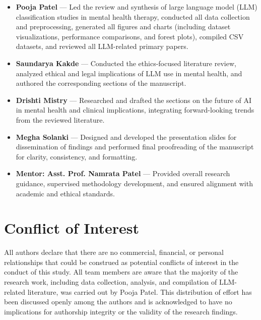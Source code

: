\documentclass[journal]{IEEEtran}
\begin{document}
\begin{itemize}
    \item \textbf{Pooja Patel} --- Led the review and synthesis of large language model (LLM) classification studies in mental health therapy, conducted all data collection and preprocessing, generated all figures and charts (including dataset visualizations, performance comparisons, and forest plots), compiled CSV datasets, and reviewed all LLM-related primary papers.
    
    \item \textbf{Saundarya Kakde} --- Conducted the ethics-focused literature review, analyzed ethical and legal implications of LLM use in mental health, and authored the corresponding sections of the manuscript.
    
    \item \textbf{Drishti Mistry} --- Researched and drafted the sections on the future of AI in mental health and clinical implications, integrating forward-looking trends from the reviewed literature.
    
    \item \textbf{Megha Solanki} --- Designed and developed the presentation slides for dissemination of findings and performed final proofreading of the manuscript for clarity, consistency, and formatting.
    
    \item \textbf{Mentor: Asst. Prof. Namrata Patel} --- Provided overall research guidance, supervised methodology development, and ensured alignment with academic and ethical standards.
\end{itemize}

\section*{Conflict of Interest}

All authors declare that there are no commercial, financial, or personal relationships that could be construed as potential conflicts of interest in the conduct of this study. All team members are aware that the majority of the research work, including data collection, analysis, and compilation of LLM-related literature, was carried out by Pooja Patel. This distribution of effort has been discussed openly among the authors and is acknowledged to have no implications for authorship integrity or the validity of the research findings.
\end{document}
